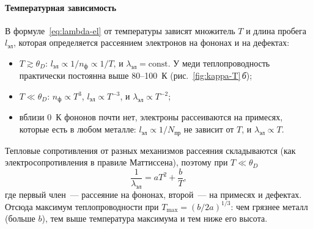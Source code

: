 \paragraph{Температурная зависимость}
В формуле~\eqref{eq:lambda-el} от температуры зависят множитель $T$ и длина
пробега $l_\text{эл}$, которая определяется рассеянием электронов на фононах
и на дефектах:
\begin{itemize}
\item $T\gtrsim\theta_D$: $l_\text{эл}\propto1/n_\text{ф}\propto1/T$, и
$\lambda_\text{эл}=\text{const}$. У меди теплопроводность практически
постоянна выше 80--100~К (рис.~\ref{fig:kappa-T}\,\textit{б});
\item $T\ll\theta_D$: $n_\text{ф}\propto T^3$, $l_\text{эл}\propto T^{-3}$, и
$\lambda_\text{эл}\propto T^{-2}$;
\item вблизи 0~К фононов почти нет, электроны рассеиваются на примесях,
которые есть в любом металле: $l_\text{эл}\propto1/N_\text{пр}$ не зависит от
$T$, и $\lambda_\text{эл}\propto T$.
\end{itemize}
Тепловые сопротивления от разных механизмов рассеяния складываются (как
электросопротивления в правиле Маттиссена), поэтому при $T\ll\theta_D$
\begin{equation}\label{eq:W-metal}
\frac1{\lambda_\text{эл}}=aT^2+\frac bT ,
\end{equation}
где первый член~— рассеяние на фононах, второй~— на примесях и дефектах.
Отсюда максимум теплопроводности при $T_{\max}=(b/2a)^{1/3}$: чем грязнее
металл (больше $b$), тем выше температура максимума и тем ниже его высота.

